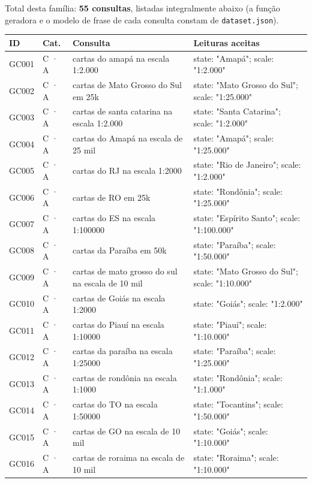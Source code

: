 Total desta fam\'ilia: \textbf{55 consultas}, listadas integralmente abaixo (a fun\c{c}\~ao geradora e o modelo de frase de cada consulta constam de \texttt{dataset.json}).

{\footnotesize
\begin{longtable}{|p{1.1cm}|p{1.3cm}|p{5.4cm}|p{6.3cm}|}
\hline
\textbf{ID} & \textbf{Cat.} & \textbf{Consulta} & \textbf{Leituras aceitas} \\ \hline
\endhead
GC001 & C · A & cartas do amapá na escala 1:2.000 & state: "Amapá"; scale: "1:2.000" \\ \hline
GC002 & C · A & cartas de Mato Grosso do Sul em 25k & state: "Mato Grosso do Sul"; scale: "1:25.000" \\ \hline
GC003 & C · A & cartas de santa catarina na escala 1:2.000 & state: "Santa Catarina"; scale: "1:2.000" \\ \hline
GC004 & C · A & cartas do Amapá na escala de 25 mil & state: "Amapá"; scale: "1:25.000" \\ \hline
GC005 & C · A & cartas do RJ na escala 1:2000 & state: "Rio de Janeiro"; scale: "1:2.000" \\ \hline
GC006 & C · A & cartas de RO em 25k & state: "Rondônia"; scale: "1:25.000" \\ \hline
GC007 & C · A & cartas do ES na escala 1:100000 & state: "Espírito Santo"; scale: "1:100.000" \\ \hline
GC008 & C · A & cartas da Paraíba em 50k & state: "Paraíba"; scale: "1:50.000" \\ \hline
GC009 & C · A & cartas de mato grosso do sul na escala de 10 mil & state: "Mato Grosso do Sul"; scale: "1:10.000" \\ \hline
GC010 & C · A & cartas de Goiás na escala 1:2000 & state: "Goiás"; scale: "1:2.000" \\ \hline
GC011 & C · A & cartas do Piauí na escala 1:10000 & state: "Piauí"; scale: "1:10.000" \\ \hline
GC012 & C · A & cartas da paraíba na escala 1:25000 & state: "Paraíba"; scale: "1:25.000" \\ \hline
GC013 & C · A & cartas de rondônia na escala 1:1000 & state: "Rondônia"; scale: "1:1.000" \\ \hline
GC014 & C · A & cartas do TO na escala 1:50000 & state: "Tocantins"; scale: "1:50.000" \\ \hline
GC015 & C · A & cartas de GO na escala de 10 mil & state: "Goiás"; scale: "1:10.000" \\ \hline
GC016 & C · A & cartas de roraima na escala de 10 mil & state: "Roraima"; scale: "1:10.000" \\ \hline

\end{longtable}}
